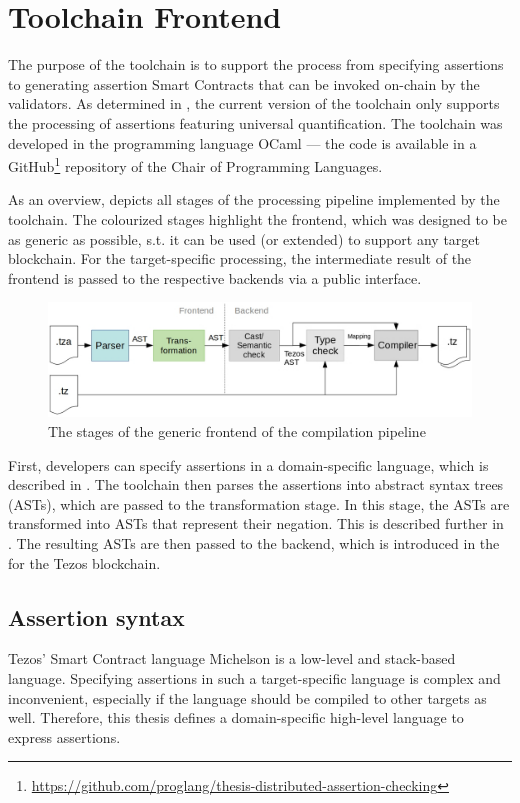 \chapter{Toolchain Frontend}\label{chap:offline}
The purpose of the toolchain is to support the process from specifying assertions to generating assertion Smart Contracts that can be invoked on-chain by the validators. As determined in , the current version of the toolchain only supports the processing of assertions featuring universal quantification. The toolchain was developed in the programming language OCaml \cite{ocaml_docs} --- the code is available in a GitHub\footnote{\url{https://github.com/proglang/thesis-distributed-assertion-checking}} repository of the Chair of Programming Languages.

As an overview,  depicts all stages of the processing pipeline implemented by the toolchain. The colourized stages highlight the frontend, which was designed to be as generic as possible, s.t. it can be used (or extended) to support any target blockchain. For the target-specific processing, the intermediate result of the frontend is passed to the respective backends via a public interface.

\begin{figure}[h]
\includegraphics[width=\linewidth]{figures/3-offline/pipeline_frontend}
\caption{The stages of the generic frontend of the compilation pipeline}
\label{fig:pipeline_frontend}
\end{figure}

First, developers can specify assertions in a domain-specific language, which is described in . The toolchain then parses the assertions into abstract syntax trees (ASTs), which are passed to the transformation stage. In this stage, the ASTs are transformed into ASTs that represent their negation. This is described further in . The resulting ASTs are then passed to the backend, which is introduced in the  for the Tezos blockchain.

\section{Assertion syntax}\label{sec:syntax}
Tezos' Smart Contract language Michelson is a low-level and stack-based language. Specifying assertions in such a target-specific language is complex and inconvenient, especially if the language should be compiled to other targets as well. Therefore, this thesis defines a domain-specific high-level language to express assertions. 

